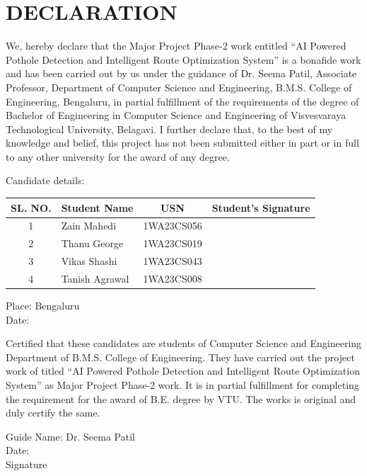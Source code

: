 \documentclass[12pt,a4paper]{report}
\begin{document}
\chapter*{DECLARATION}
\thispagestyle{empty}
We, hereby declare that the Major Project Phase-2 work entitled ``AI Powered Pothole Detection and Intelligent Route Optimization System'' is a bonafide work and has been carried out  by us under the guidance of Dr. Seema Patil, Associate Professor, Department of Computer Science and Engineering, B.M.S. College of Engineering, Bengaluru, in partial  fulfillment of the requirements of the degree of Bachelor of Engineering in Computer Science  and Engineering of Visvesvaraya Technological University, Belagavi.
I further declare that, to the best of my knowledge and belief, this project has not been  submitted either in part or in full to any other university for the award of any degree.
\vspace{0.3cm}
\begin{flushleft}
Candidate details:
\end{flushleft}
\vspace{0.1cm}
\begin{center}
\begin{tabular}{|c|l|c|c|}
\hline
\textbf{SL. NO.} & \textbf{Student Name} & \textbf{USN} & \textbf{Student's Signature} \\
\hline
1 & Zain Mahedi & 1WA23CS056 & \\
\hline
2 & Thanu George & 1WA23CS019 & \\
\hline
3 & Vikas Shashi & 1WA23CS043 & \\
\hline
4 & Tanish Agrawal & 1WA23CS008 & \\
\hline
\end{tabular}
\end{center}
\begin{flushleft}
Place: Bengaluru \\
Date: \\
\end{flushleft}
Certified that these candidates are students of Computer Science and Engineering Department  of B.M.S. College of Engineering. They have carried out the project work of titled ``AI Powered Pothole Detection and Intelligent Route Optimization System'' as Major Project Phase-2  work. It is in partial fulfillment for completing the requirement for the award of B.E. degree  by VTU. The works is original and duly certify the same.
\vspace{1cm}
\begin{flushleft}
Guide Name: Dr. Seema Patil \\
Date: \\
Signature \\
\end{flushleft}
\end{document}
